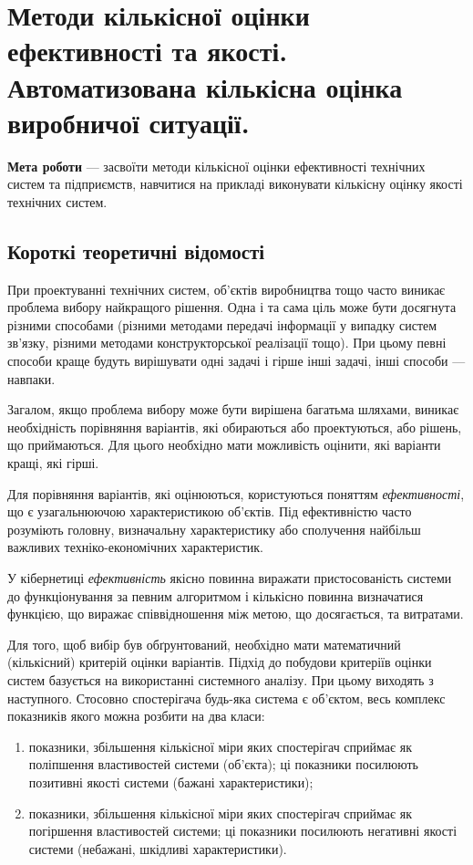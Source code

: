 \chapter[~]{Методи кількісної оцінки ефективності та якості. Автоматизована кількісна оцінка виробничої
ситуації.}

\textbf{Мета роботи} --- засвоїти методи кількісної оцінки ефективності технічних систем та
підприємств, навчитися на прикладі виконувати кількісну оцінку якості технічних систем.

\section{Короткі теоретичні відомості}

При проектуванні технічних систем, об’єктів виробництва тощо часто виникає проблема вибору
найкращого рішення. Одна і та сама ціль може бути досягнута різними способами (різними методами
передачі інформації у випадку систем зв’язку, різними методами конструкторської реалізації
тощо). При цьому певні способи краще будуть вирішувати одні задачі і гірше інші задачі, інші способи
--- навпаки.

Загалом, якщо проблема вибору може бути вирішена багатьма шляхами, виникає необхідність порівняння
варіантів, які обираються або проектуються, або рішень, що приймаються. Для цього необхідно мати
можливість оцінити, які варіанти кращі, які гірші.

Для порівняння варіантів, які оцінюються, користуються поняттям \textit{ефективності}, що є
узагальнюючою характеристикою об’єктів. Під ефективністю часто розуміють головну, визначальну
характеристику або сполучення найбільш важливих техніко-економічних характеристик.

У кібернетиці \textit{ефективність} якісно повинна виражати пристосованість системи до
функціонування за певним алгоритмом і кількісно повинна визначатися функцією, що виражає
співвідношення між метою, що досягається, та витратами.

Для того, щоб вибір був обґрунтований, необхідно мати математичний (кількісний) критерій оцінки
варіантів. Підхід до побудови критеріїв оцінки систем базується на використанні системного
аналізу. При цьому виходять з наступного. Стосовно спостерігача будь-яка система є об'єктом, весь
комплекс показників якого можна розбити на два класи:

\begin{enumerate}
\item показники, збільшення кількісної міри яких спостерігач сприймає як поліпшення властивостей
системи (об’єкта); ці показники посилюють позитивні якості системи (бажані характеристики);
\item показники, збільшення кількісної міри яких спостерігач сприймає як погіршення властивостей
системи; ці показники посилюють негативні якості системи (небажані, шкідливі характеристики).
\end{enumerate}
   
